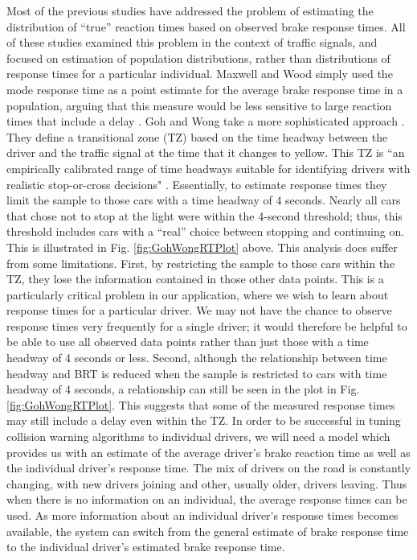 \documentclass[conference]{IEEEtran}
\begin{document}
Most of the previous studies have addressed the problem of estimating the distribution of ``true'' reaction times based on observed brake response times.  All of these studies examined this problem in the context of traffic signals, and focused on estimation of population distributions, rather than distributions of response times for a particular individual.
Maxwell and Wood simply used the mode response time as a point estimate for the average brake response time in a population, arguing that this measure would be less sensitive to large reaction times that include a delay \cite{MaxwellWood:ReviewTrafficSignal}.  Goh and Wong take a more sophisticated approach \cite{GohWong:DriverPRTDuringSignalChange}.  They define a transitional zone (TZ) based on the time headway between the driver and the traffic signal at the time that it changes to yellow.  This TZ is ``an empirically calibrated range of time headways suitable for identifying drivers with realistic stop-or-cross decisions" \cite{GohWong:DriverPRTDuringSignalChange}.  Essentially, to estimate response times they limit the sample to those cars with a time headway of  4 seconds.  Nearly all cars that chose not to stop at the light were within the 4-second threshold; thus, this threshold includes cars with a ``real'' choice between stopping and continuing on.  This is illustrated in Fig. \ref{fig:GohWongRTPlot} above.
This analysis does suffer from some limitations.  First, by restricting the sample to those cars within the TZ, they lose the information contained in those other data points.  This is a particularly critical problem in our application, where we wish to learn about response times for a particular driver.  We may not have the chance to observe response times very frequently for a single driver; it would therefore be helpful to be able to use all observed data points rather than just those with a time headway of 4 seconds or less.  Second, although the relationship between time headway and BRT is reduced when the sample is restricted to cars with time headway of  4 seconds, a relationship can still be seen in the plot in Fig. \ref{fig:GohWongRTPlot}.  This suggests that some of the measured response times may still include a delay even within the TZ.
In order to be successful in tuning collision warning algorithms to individual drivers, we will need a model which provides us with an estimate of the average driver's brake reaction time as well as the individual driver's response time.  The mix of drivers on the road is constantly changing, with new drivers joining and other, usually older, drivers leaving.  Thus when there is no information on an individual, the average response times can be used.  As more information about an individual driver's response times becomes available, the system can switch from the general estimate of brake response time to the individual driver's estimated brake response time.
\end{document}
